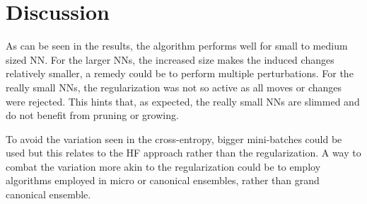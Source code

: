 \chapter{Discussion}

As can be seen in the results, the algorithm performs well for small to medium sized NN. For the larger NNs, the increased size makes the induced changes relatively smaller, a remedy could be to perform multiple perturbations. For the really small NNs, the regularization was not so active as all moves or changes were rejected. This hints that, as expected, the really small NNs are slimmed and do not benefit from pruning or growing. 

To avoid the variation seen in the cross-entropy, bigger mini-batches could be used but this relates to the HF approach rather than the regularization. A way to combat the variation more akin to the regularization could be to employ algorithms employed in micro or canonical ensembles, rather than grand canonical ensemble.